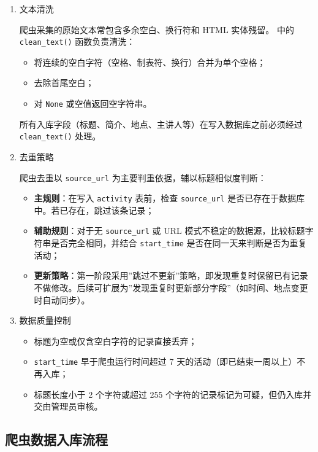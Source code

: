 \documentclass[UTF8,a4paper,12pt,fontset=none]{ctexrep}
\providecommand{\tightlist}{}
\begin{document}
\begin{enumerate}
\def\labelenumi{\arabic{enumi}.}
\item
  文本清洗

  爬虫采集的原始文本常包含多余空白、换行符和 HTML 实体残留。
   中的 \texttt{clean\_text()} 函数负责清洗：

  \begin{itemize}
  \tightlist
  \item
    将连续的空白字符（空格、制表符、换行）合并为单个空格；
  \item
    去除首尾空白；
  \item
    对 \texttt{None} 或空值返回空字符串。
  \end{itemize}

  所有入库字段（标题、简介、地点、主讲人等）在写入数据库之前必须经过 \texttt{clean\_text()} 处理。
\item
  去重策略

  爬虫去重以 \texttt{source\_url} 为主要判重依据，辅以标题相似度判断：

  \begin{itemize}
  \tightlist
  \item
    \textbf{主规则}：在写入 \texttt{activity} 表前，检查 \texttt{source\_url} 是否已存在于数据库中。若已存在，跳过该条记录；
  \item
    \textbf{辅助规则}：对于无 \texttt{source\_url} 或 URL 模式不稳定的数据源，比较标题字符串是否完全相同，并结合 \texttt{start\_time} 是否在同一天来判断是否为重复活动；
  \item
    \textbf{更新策略}：第一阶段采用''跳过不更新''策略，即发现重复时保留已有记录不做修改。后续可扩展为''发现重复时更新部分字段''（如时间、地点变更时自动同步）。
  \end{itemize}
\item
  数据质量控制

  \begin{itemize}
  \tightlist
  \item
    标题为空或仅含空白字符的记录直接丢弃；
  \item
    \texttt{start\_time} 早于爬虫运行时间超过 7 天的活动（即已结束一周以上）不再入库；
  \item
    标题长度小于 2 个字符或超过 255 个字符的记录标记为可疑，但仍入库并交由管理员审核。
  \end{itemize}
\end{enumerate}

\subsection{爬虫数据入库流程}\label{ux722cux866bux6570ux636eux5165ux5e93ux6d41ux7a0b}
\end{document}
